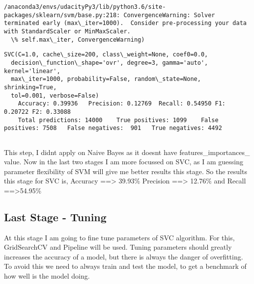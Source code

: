 \documentclass[11pt]{article}
\begin{document}
    \begin{Verbatim}[commandchars=\\\{\}]
/anaconda3/envs/udacityPy3/lib/python3.6/site-packages/sklearn/svm/base.py:218: ConvergenceWarning: Solver terminated early (max\_iter=1000).  Consider pre-processing your data with StandardScaler or MinMaxScaler.
  \% self.max\_iter, ConvergenceWarning)

    \end{Verbatim}

    \begin{Verbatim}[commandchars=\\\{\}]
SVC(C=1.0, cache\_size=200, class\_weight=None, coef0=0.0,
  decision\_function\_shape='ovr', degree=3, gamma='auto', kernel='linear',
  max\_iter=1000, probability=False, random\_state=None, shrinking=True,
  tol=0.001, verbose=False)
	Accuracy: 0.39936	Precision: 0.12769	Recall: 0.54950	F1: 0.20722	F2: 0.33088
	Total predictions: 14000	True positives: 1099	False positives: 7508	False negatives:  901	True negatives: 4492


    \end{Verbatim}

    This step, I didnt apply on Naive Bayes as it doesnt have
features\_importances\_ value. Now in the last two stages I am more
focussed on SVC, as I am guessing parameter flexibility of SVM will give
me better results this stage. So the results this stage for SVC is,
Accuracy ==\textgreater{} 39.93\% Precision ==\textgreater{} 12.76\% and
Recall ==\textgreater{}54.95\%

    \subsection{Last Stage - Tuning}\label{last-stage---tuning}

At this stage I am going to fine tune parameters of SVC algorithm. For
this, GridSearchCV and Pipeline will be used. Tuning parameters should
greatly increases the accuracy of a model, but there is always the
danger of overfitting. To avoid this we need to always train and test
the model, to get a benchmark of how well is the model doing.
\end{document}
